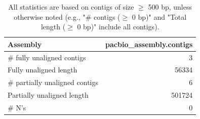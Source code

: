 \documentclass[12pt,a4paper]{article}
\begin{document}
\begin{table}[ht]
\begin{center}
\caption{All statistics are based on contigs of size $\geq$ 500 bp, unless otherwise noted (e.g., "\# contigs ($\geq$ 0 bp)" and "Total length ($\geq$ 0 bp)" include all contigs).}
\begin{tabular}{|l*{1}{|r}|}
\hline
Assembly & pacbio\_assembly.contigs \\ \hline
\# fully unaligned contigs & 3 \\ \hline
Fully unaligned length & 56334 \\ \hline
\# partially unaligned contigs & 6 \\ \hline
Partially unaligned length & 501724 \\ \hline
\# N's & 0 \\ \hline
\end{tabular}
\end{center}
\end{table}
\end{document}
